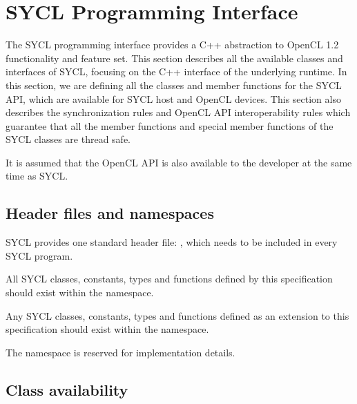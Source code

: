 \def \debugging{false}

\chapter{SYCL Programming Interface}
\label{chapter:sycl-programming-interface}

The SYCL programming interface provides a C++ abstraction to OpenCL
1.2 functionality and feature set. This section describes all the
available classes and interfaces of SYCL, focusing on the C++
interface of the underlying runtime. In this section, we are defining
all the classes and member functions for the SYCL API, which are available for
SYCL host and OpenCL devices. This section also describes the
synchronization rules and OpenCL API interoperability rules which
guarantee that all the member functions and special member functions of the SYCL
classes are thread safe.

It is assumed that the OpenCL API is also available to the developer
at the same time as SYCL.

\section{Header files and namespaces}
\label{sec:headers-and-namespaces}

SYCL provides one standard header file: ,
which needs to be included in every SYCL program.

All SYCL classes, constants, types and functions defined by this
specification should exist within the  namespace.

Any SYCL classes, constants, types and functions defined as an extension
to this specification should exist within the
 namespace.

The  namespace is reserved for
implementation details.

\section{Class availability}

